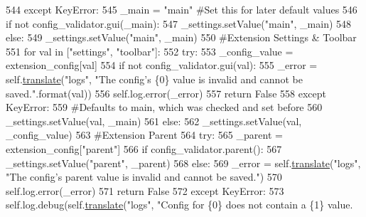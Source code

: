 \begin{DoxyCode}
544         \textcolor{keywordflow}{except} KeyError:
545             \_main = \textcolor{stringliteral}{"main"} \textcolor{comment}{#Set this for later default values}
546             \textcolor{keywordflow}{if} \textcolor{keywordflow}{not} config\_validator.gui(\_main):
547                 \_settings.setValue(\textcolor{stringliteral}{"main"}, \_main)
548         \textcolor{keywordflow}{else}:
549             \_settings.setValue(\textcolor{stringliteral}{"main"}, \_main)
550         \textcolor{comment}{#Extension Settings & Toolbar}
551         \textcolor{keywordflow}{for} val \textcolor{keywordflow}{in} [\textcolor{stringliteral}{"settings"}, \textcolor{stringliteral}{"toolbar"}]:
552             \textcolor{keywordflow}{try}:
553                 \_config\_value = extension\_config[val]
554                 \textcolor{keywordflow}{if} \textcolor{keywordflow}{not} config\_validator.gui(val):
555                     \_error = self.\hyperlink{classcommotion__client_1_1utils_1_1extension__manager_1_1ExtensionManager_a2cfd032ca383c3fd6f0f52b99b6dd67c}{translate}(\textcolor{stringliteral}{"logs"}, \textcolor{stringliteral}{"The config's \{0\} value is invalid and cannot
       be saved."}.format(val))
556                     self.log.error(\_error)
557                     \textcolor{keywordflow}{return} \textcolor{keyword}{False}
558             \textcolor{keywordflow}{except} KeyError:
559                 \textcolor{comment}{#Defaults to main, which was checked and set before}
560                 \_settings.setValue(val, \_main)
561             \textcolor{keywordflow}{else}:
562                 \_settings.setValue(val, \_config\_value)
563         \textcolor{comment}{#Extension Parent}
564         \textcolor{keywordflow}{try}:
565             \_parent = extension\_config[\textcolor{stringliteral}{"parent"}]
566             \textcolor{keywordflow}{if} config\_validator.parent():
567                 \_settings.setValue(\textcolor{stringliteral}{"parent"}, \_parent)
568             \textcolor{keywordflow}{else}:
569                 \_error = self.\hyperlink{classcommotion__client_1_1utils_1_1extension__manager_1_1ExtensionManager_a2cfd032ca383c3fd6f0f52b99b6dd67c}{translate}(\textcolor{stringliteral}{"logs"}, \textcolor{stringliteral}{"The config's parent value is invalid and cannot
       be saved."})
570                 self.log.error(\_error)
571                 \textcolor{keywordflow}{return} \textcolor{keyword}{False}
572         \textcolor{keywordflow}{except} KeyError:
573             self.log.debug(self.\hyperlink{classcommotion__client_1_1utils_1_1extension__manager_1_1ExtensionManager_a2cfd032ca383c3fd6f0f52b99b6dd67c}{translate}(\textcolor{stringliteral}{"logs"}, \textcolor{stringliteral}{"Config for \{0\} does not contain a \{1\} value.
}
\end{DoxyCode}
